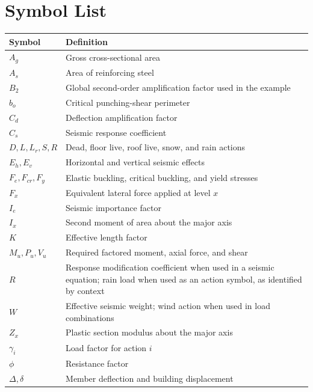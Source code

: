 \section{Symbol List}

\begin{longtable}{@{}p{24mm}p{112mm}@{}}
  \toprule
  \textbf{Symbol} & \textbf{Definition} \\
  \midrule
  \endhead
  $A_g$ & Gross cross-sectional area \\
  $A_s$ & Area of reinforcing steel \\
  $B_2$ & Global second-order amplification factor used in the example \\
  $b_o$ & Critical punching-shear perimeter \\
  $C_d$ & Deflection amplification factor \\
  $C_s$ & Seismic response coefficient \\
  $D,L,L_r,S,R$ & Dead, floor live, roof live, snow, and rain actions \\
  $E_h,E_v$ & Horizontal and vertical seismic effects \\
  $F_e,F_{cr},F_y$ & Elastic buckling, critical buckling, and yield stresses \\
  $F_x$ & Equivalent lateral force applied at level $x$ \\
  $I_e$ & Seismic importance factor \\
  $I_x$ & Second moment of area about the major axis \\
  $K$ & Effective length factor \\
  $M_u,P_u,V_u$ & Required factored moment, axial force, and shear \\
  $R$ & Response modification coefficient when used in a seismic equation; rain load
    when used as an action symbol, as identified by context \\
  $W$ & Effective seismic weight; wind action when used in load combinations \\
  $Z_x$ & Plastic section modulus about the major axis \\
  $\gamma_i$ & Load factor for action $i$ \\
  $\phi$ & Resistance factor \\
  $\Delta,\delta$ & Member deflection and building displacement \\
  \bottomrule
\end{longtable}
